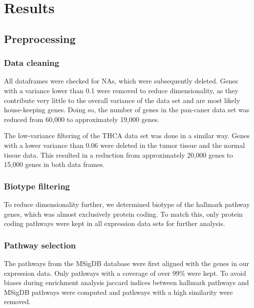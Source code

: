 \documentclass[
]{article}
\author{}
\date{\vspace{-2.5em}}
\begin{document}
\hypertarget{results}{%
\section{Results}\label{results}}

\hypertarget{preprocessing}{%
\subsection{Preprocessing}\label{preprocessing}}

\hypertarget{data-cleaning}{%
\subsubsection{Data cleaning}\label{data-cleaning}}

All dataframes were checked for NAs, which were subsequently deleted.
Genes with a variance lower than 0.1 were removed to reduce
dimensionality, as they contribute very little to the overall variance
of the data set and are most likely house-keeping genes. Doing so, the
number of genes in the pan-caner data set was reduced from 60,000 to
approximately 19,000 genes.

The low-variance filtering of the THCA data set was done in a similar
way. Genes with a lower variance than 0.06 were deleted in the tumor
tissue and the normal tissue data. This resulted in a reduction from
approximately 20,000 genes to 15,000 genes in both data frames.

\hypertarget{biotype-filtering}{%
\subsubsection{Biotype filtering}\label{biotype-filtering}}

To reduce dimensionality further, we determined biotype of the hallmark
pathway genes, which was almost exclusively protein coding. To match
this, only protein coding pathways were kept in all expression data sets
for further analysis.

\hypertarget{pathway-selection}{%
\subsubsection{Pathway selection}\label{pathway-selection}}

The pathways from the MSigDB database were first aligned with the genes
in our expression data. Only pathways with a coverage of over 99\% were
kept. To avoid biases during enrichment analysis jaccard indices between
hallmark pathways and MSigDB pathways were computed and pathways with a
high similarity were removed.
\end{document}
